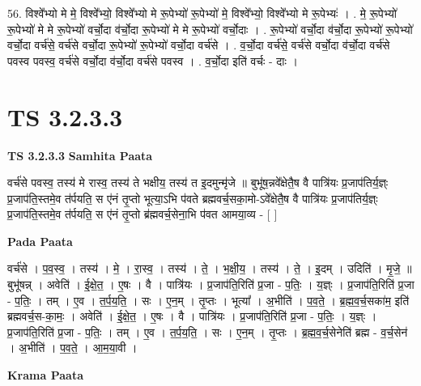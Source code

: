\documentclass[17pt]{extarticle}
\begin{document}
56. विश्वे᳚भ्यो मे मे॒ विश्वे᳚भ्यो॒ विश्वे᳚भ्यो मे रू॒पेभ्यो॑ रू॒पेभ्यो॑ मे॒ विश्वे᳚भ्यो॒ विश्वे᳚भ्यो मे रू॒पेभ्यः॑ । . मे॒ रू॒पेभ्यो॑ रू॒पेभ्यो॑ मे मे रू॒पेभ्यो॑ वर्चो॒दा व॑र्चो॒दा रू॒पेभ्यो॑ मे मे रू॒पेभ्यो॑ वर्चो॒दाः । . रू॒पेभ्यो॑ वर्चो॒दा व॑र्चो॒दा रू॒पेभ्यो॑ रू॒पेभ्यो॑ वर्चो॒दा वर्च॑से॒ वर्च॑से वर्चो॒दा रू॒पेभ्यो॑ रू॒पेभ्यो॑ वर्चो॒दा वर्च॑से । . व॒र्चो॒दा वर्च॑से॒ वर्च॑से वर्चो॒दा व॑र्चो॒दा वर्च॑से पवस्व पवस्व॒ वर्च॑से वर्चो॒दा व॑र्चो॒दा वर्च॑से पवस्व । . व॒र्चो॒दा इति॑ वर्चः - दाः । \newline
\pagebreak
{}

\section{ TS 3.2.3.3 }

\textbf{TS 3.2.3.3 } \newline
\textbf{Samhita Paata} \newline

वर्च॑से पवस्व॒ तस्य॑ मे रास्व॒ तस्य॑ ते भक्षीय॒ तस्य॑ त इ॒दमुन्मृ॑जे ॥ बुभू॑ष॒न्नवे᳚क्षेतै॒ष वै पात्रि॑यः प्र॒जाप॑तिर्य॒ज्ञ्ः प्र॒जाप॑ति॒स्तमे॒व त॑र्पयति॒ स ए॑नं तृ॒प्तो भूत्या॒ऽभि प॑वते ब्रह्मवर्च॒सका॒मो-ऽवे᳚क्षेतै॒ष वै पात्रि॑यः प्र॒जाप॑तिर्य॒ज्ञ्ः प्र॒जाप॑ति॒स्तमे॒व त॑र्पयति॒ स ए॑नं तृ॒प्तो ब्र॑ह्मवर्च॒सेना॒भि प॑वत आमया॒व्य - [  ] \newline

\textbf{Pada Paata} \newline

वर्च॑से । प॒व॒स्व॒ । तस्य॑ । मे॒ । रा॒स्व॒ । तस्य॑ । ते॒ । भ॒क्षी॒य॒ । तस्य॑ । ते॒ । इ॒दम् । उदिति॑ । मृ॒जे॒ ॥ बुभू॑षन्न् । अवेति॑ । ई॒क्षे॒त॒ । ए॒षः । वै । पात्रि॑यः । प्र॒जाप॑ति॒रिति॑ प्र॒जा - प॒तिः॒ । य॒ज्ञ्ः । प्र॒जाप॑ति॒रिति॑ प्र॒जा - प॒तिः॒ । तम् । ए॒व । त॒र्प॒य॒ति॒ । सः । ए॒न॒म् । तृ॒प्तः । भूत्या᳚ । अ॒भीति॑ । प॒व॒ते॒ । ब्र॒ह्म॒व॒र्च॒सका॑म॒ इति॑ ब्रह्मवर्च॒स-का॒मः॒ । अवेति॑ । ई॒क्षे॒त॒ । ए॒षः । वै । पात्रि॑यः । प्र॒जाप॑ति॒रिति॑ प्र॒जा - प॒तिः॒ । य॒ज्ञ्ः । प्र॒जाप॑ति॒रिति॑ प्र॒जा - प॒तिः॒ । तम् । ए॒व । त॒र्प॒य॒ति॒ । सः । ए॒न॒म् । तृ॒प्तः । ब्र॒ह्म॒व॒र्च॒सेनेति॑ ब्रह्म - व॒र्च॒सेन॑ । अ॒भीति॑ । प॒व॒ते॒ । आ॒म॒या॒वी ।  \newline


\textbf{Krama Paata} \newline
\end{document}
